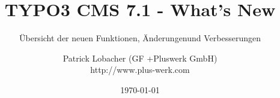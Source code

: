 %

%
%

\documentclass[t]{beamer}

\beamertemplatenavigationsymbolsempty

{
	\usetheme{typo3slides}
}

\title{TYPO3 CMS 7.1 - What's New}
\subtitle{Übersicht der neuen Funktionen, Änderungen\newline und Verbesserungen}
\author{
	\centerline{Patrick Lobacher (GF +Pluswerk GmbH)}
	\smaller http://www.plus-werk.com
}
\date{\today}



\sharefont


\begingroup
	[default]
	\begin{frame}
		\titlepage
	\end{frame}
\endgroup


\section*{TYPO3 CMS 7.1 - What's New}
\begin{frame}[fragile]
	\frametitle{Kapitelübersicht}
	\framesubtitle{Kapitelübersicht}

	\begin{multicols}{2}
		\tableofcontents
	\end{multicols}

\end{frame}


